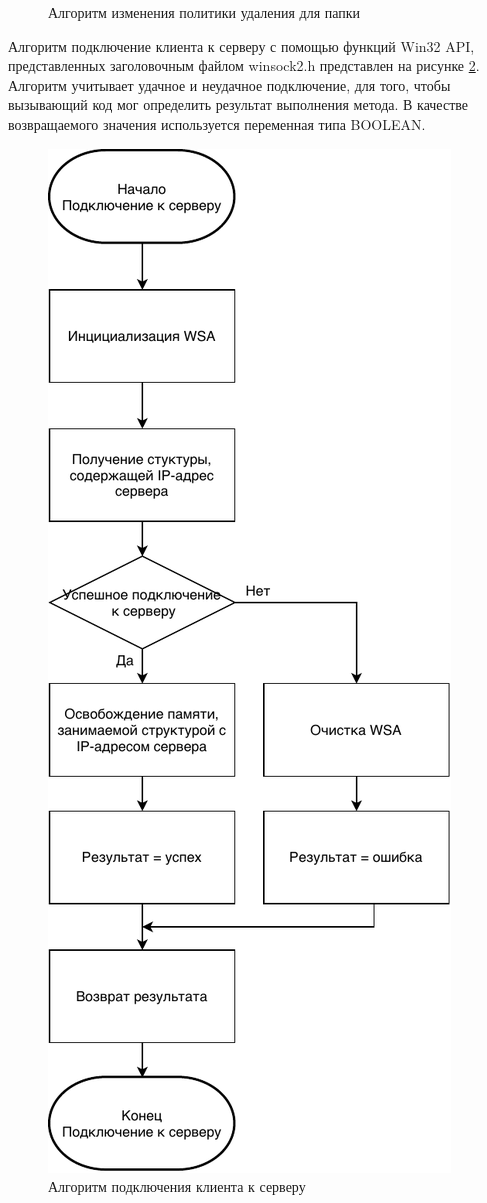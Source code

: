 \begin{figure}[!hb]
	  \caption{ Алгоритм изменения политики удаления для папки }
	  \label{sec:development:algos:deletepolicy}
\end{figure}

Алгоритм подключение клиента к серверу с помощью функций Win32 API, представленных заголовочным файлом winsock2.h представлен на рисунке \ref*{sec:development:algos:clientconnect}. Алгоритм учитывает удачное и неудачное подключение, для того, чтобы вызывающий код мог определить результат выполнения метода. В качестве возвращаемого значения используется переменная типа BOOLEAN. 

\begin{figure}[hb]
	\centering
	  \includegraphics[scale=1]{attachments/ClientConnect.pdf}  
	  \caption{ Алгоритм подключения клиента к серверу }
	  \label{sec:development:algos:clientconnect}
\end{figure}

